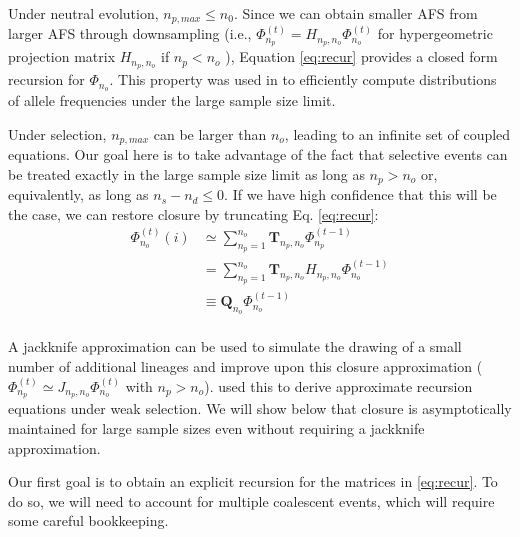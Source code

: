 \documentclass[review]{elsarticle}
\newcommand{\afs}[2]{\Phi_{#1}^{(#2)}}
\begin{document}
Under neutral evolution, $n_{p,max}\leq n_0$. Since we can obtain smaller AFS from larger AFS through downsampling 
(i.e., $\afs{n_p}{t}  = H_{n_p,n_o} \afs{n_o}{t}$ for hypergeometric projection matrix $H_{n_p,n_o}$ if $n_p<n_o$ ), 
Equation \eqref{eq:recur} provides a closed form recursion for $\Phi_{n_o}.$ This property was used in \cite{JouganousEtAl2017} 
to efficiently compute distributions of allele frequencies under the large sample size limit.  

Under selection, $n_{p,max}$ can be larger than $n_o$, leading to an infinite set of coupled equations. 
Our goal here is to take advantage of the fact that selective events can be treated exactly in the large sample size limit 
as long as  $n_p > n_o$ or,  equivalently, as long as  $n_s - n_d \leq 0.$ 
If we have high confidence that this will be the case, we can restore closure by truncating Eq. \eqref{eq:recur}:
\begin{equation}
\begin{split}
\afs{n_o}{t}(i)&\simeq \sum_{n_p=1}^{n_{o}} \mathbf{T}_{n_p,n_o}   \afs{n_p}{t-1} \\
&=   \sum_{n_p=1}^{n_{o}} \mathbf{T}_{n_p,n_o} H_{n_p,n_o}  \afs{n_o}{t-1}\\ 
&\equiv    \mathbf{Q}_{n_o}  \afs{n_o}{t-1}\\ 
\end{split}
\label{eq:truncated}
\end{equation}

A jackknife approximation can be used to simulate the drawing of a small number of additional lineages and improve upon 
this closure approximation ($\afs{n_p}{t}  \simeq J_{n_p,n_o} \afs{n_o}{t}$ with $n_p>n_o$).
\cite{JouganousEtAl2017} used this to derive approximate recursion equations under weak selection. 
We will show below that closure is asymptotically maintained for large sample sizes even without requiring a jackknife approximation. 



Our first goal is to obtain an explicit recursion for the matrices in \eqref{eq:recur}. 
To do so, we will need to account for multiple coalescent events, which will require some careful bookkeeping.
\end{document}
